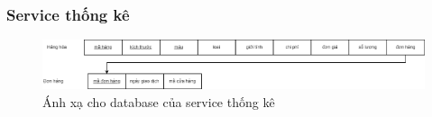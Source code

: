 \subsubsection{Service thống kê}
\begin{figure}[!htp]
    \begin{center}
        \includegraphics[width=1\textwidth]{img/database/mapping/Statistic.png}
        \newline
        \caption{Ánh xạ cho database của service thống kê}
    \end{center}
\end{figure}